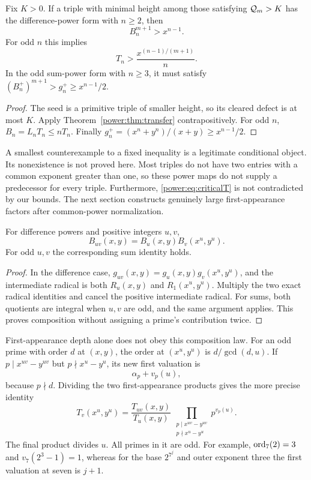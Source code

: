 \begin{corollary}\label{power:cor:descent}
Fix $K>0$. If a triple with minimal height among those satisfying
$\mathcal Q_m>K$ has the difference-power form with $n\ge2$, then
\[
B_n^{m+1}>x^{n-1}.
\]
For odd $n$ this implies
\begin{equation}\label{power:eq:criticalT}
T_n>\frac{x^{(n-1)/(m+1)}}{n}.
\end{equation}
In the odd sum-power form with $n\ge3$, it must satisfy
$(B_n^+)^{m+1}>g_n^+\ge x^{n-1}/2$.
\end{corollary}
\begin{proof}
The seed is a primitive triple of smaller height, so its cleared defect is
at most $K$. Apply Theorem~\ref{power:thm:transfer} contrapositively. For odd
$n$, $B_n=L_nT_n\le nT_n$. Finally
$g_n^+=(x^n+y^n)/(x+y)\ge x^{n-1}/2$.
\end{proof}

\begin{remark}
A smallest counterexample to a fixed inequality is a legitimate conditional
object. Its nonexistence is not proved here. Most triples do not have two
entries with a common exponent greater than one, so these power maps do not
supply a predecessor for every triple. Furthermore, \eqref{power:eq:criticalT}
is not contradicted by our bounds. The next section constructs genuinely
large first-appearance factors after common-power normalization.
\end{remark}

\begin{proposition}\label{power:prop:cocycle}
For difference powers and positive integers $u,v$,
\[
B_{uv}(x,y)=B_u(x,y)B_v(x^u,y^u).
\]
For odd $u,v$ the corresponding sum identity holds.
\end{proposition}
\begin{proof}
In the difference case, $g_{uv}(x,y)=g_u(x,y)g_v(x^u,y^u)$, and the
intermediate radical is both $R_u(x,y)$ and $R_1(x^u,y^u)$. Multiply the
two exact radical identities and cancel the positive intermediate radical.
For sums, both quotients are integral when $u,v$ are odd, and the same
argument applies. This proves composition without assigning a prime's
contribution twice.
\end{proof}

First-appearance depth alone does not obey this composition law. For an odd
prime with order $d$ at $(x,y)$, the order at $(x^u,y^u)$ is
$d/\gcd(d,u)$. If $p\mid x^{uv}-y^{uv}$ but $p\nmid x^u-y^u$, its new
first valuation is
\[
\alpha_p+v_p(u),
\]
because $p\nmid d$. Dividing the two first-appearance products gives the
more precise identity
\begin{equation}\label{power:eq:rebase}
T_v(x^u,y^u)=\frac{T_{uv}(x,y)}{T_u(x,y)}\,
\prod_{\substack{p\mid x^{uv}-y^{uv}\\p\nmid x^u-y^u}}p^{v_p(u)}.
\end{equation}
The final product divides $u$. All primes in it are odd. For example,
$\operatorname{ord}_7(2)=3$ and $v_7(2^3-1)=1$, whereas for the base $2^{7^j}$ and outer
exponent three the first valuation at seven is $j+1$.

